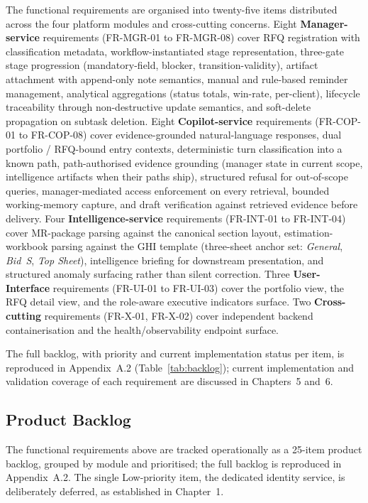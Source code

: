 The functional requirements are organised into twenty-five items distributed across the four platform modules and cross-cutting concerns. Eight \textbf{Manager-service} requirements (FR-MGR-01 to FR-MGR-08) cover RFQ registration with classification metadata, workflow-instantiated stage representation, three-gate stage progression (mandatory-field, blocker, transition-validity), artifact attachment with append-only note semantics, manual and rule-based reminder management, analytical aggregations (status totals, win-rate, per-client), lifecycle traceability through non-destructive update semantics, and soft-delete propagation on subtask deletion. Eight \textbf{Copilot-service} requirements (FR-COP-01 to FR-COP-08) cover evidence-grounded natural-language responses, dual portfolio / RFQ-bound entry contexts, deterministic turn classification into a known path, path-authorised evidence grounding (manager state in current scope, intelligence artifacts when their paths ship), structured refusal for out-of-scope queries, manager-mediated access enforcement on every retrieval, bounded working-memory capture, and draft verification against retrieved evidence before delivery. Four \textbf{Intelligence-service} requirements (FR-INT-01 to FR-INT-04) cover MR-package parsing against the canonical section layout, estimation-workbook parsing against the GHI template (three-sheet anchor set: \textit{General}, \textit{Bid~S}, \textit{Top Sheet}), intelligence briefing for downstream presentation, and structured anomaly surfacing rather than silent correction. Three \textbf{User-Interface} requirements (FR-UI-01 to FR-UI-03) cover the portfolio view, the RFQ detail view, and the role-aware executive indicators surface. Two \textbf{Cross-cutting} requirements (FR-X-01, FR-X-02) cover independent backend containerisation and the health/observability endpoint surface.

The full backlog, with priority and current implementation status per item, is reproduced in Appendix~A.2 (Table~\ref{tab:backlog}); current implementation and validation coverage of each requirement are discussed in Chapters~5 and~6.

\subsection{Product Backlog}
The functional requirements above are tracked operationally as a 25-item product backlog, grouped by module and prioritised; the full backlog is reproduced in Appendix~A.2. The single Low-priority item, the dedicated identity service, is deliberately deferred, as established in Chapter~1.

